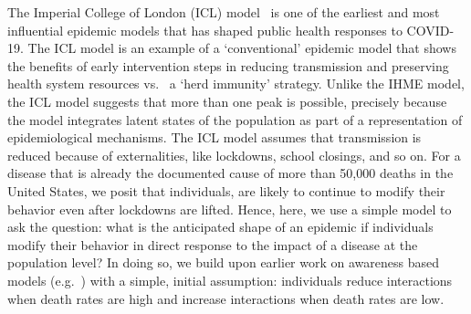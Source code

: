 The Imperial College of London (ICL) model~\citep{ferguson2020report} is
one of the earliest and most influential epidemic models that has shaped public health responses to COVID-19. The ICL model is an
example of a `conventional' epidemic model
that shows the benefits of  early intervention steps in reducing
transmission and preserving health system resources vs.~ 
a `herd immunity' strategy.  Unlike the IHME model,
the ICL model suggests that more than one peak is possible,
precisely because the model integrates latent states of the population
as part of a representation of epidemiological mechanisms.
The ICL model assumes that
transmission is reduced because of externalities, like lockdowns,
school closings, and so on.  For a disease
that is already the documented cause of more than 50,000 deaths
in the United States, we posit that individuals, 
are likely to continue to modify
their behavior even after lockdowns are lifted.  
Hence, here, we use a simple model to
ask the question: what is the anticipated
shape of an epidemic if individuals modify their behavior in direct
response to the impact of a disease at the population level? In doing so,
we build upon earlier work on awareness based models (e.g.~\citep{funk2009spread,funk2010modelling,eksin2017disease, eksin2019systematic}) with a
simple, initial assumption: individuals reduce interactions when 
death rates are high and increase interactions when death rates are low.  

